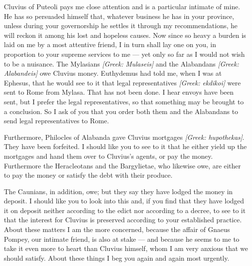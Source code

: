

 Cluvius of Puteoli pays me close attention and is a particular intimate of mine. He has so persuaded himself that, whatever business he has in your province, unless during your governorship he settles it through my recommendations, he will reckon it among his lost and hopeless causes. Now since so heavy a burden is laid on me by a most attentive friend, I in turn shall lay one on you, in proportion to your supreme services to me --- yet only so far as I would not wish to be a nuisance. The Mylasians \textit{[Greek: Mulaseis]} and the Alabandans \textit{[Greek: Alabandeis]} owe Cluvius money. Euthydemus had told me, when I was at Ephesus, that he would see to it that legal representatives \textit{[Greek: ekdikoi]} were sent to Rome from Mylasa. That has not been done. I hear envoys have been sent, but I prefer the legal representatives, so that something may be brought to a conclusion. So I ask of you that you order both them and the Alabandans to send legal representatives to Rome.

 Furthermore, Philocles of Alabanda gave Cluvius mortgages \textit{[Greek: hupothekas]}. They have been forfeited. I should like you to see to it that he either yield up the mortgages and hand them over to Cluvius's agents, or pay the money. Furthermore the Heracleotans and the Bargylietae, who likewise owe, are either to pay the money or satisfy the debt with their produce.

 The Caunians, in addition, owe; but they say they have lodged the money in deposit. I should like you to look into this and, if you find that they have lodged it on deposit neither according to the edict nor according to a decree, to see to it that the interest for Cluvius is preserved according to your established practice. About these matters I am the more concerned, because the affair of Gnaeus Pompey, our intimate friend, is also at stake --- and because he seems to me to take it even more to heart than Cluvius himself, whom I am very anxious that we should satisfy. About these things I beg you again and again most urgently.
